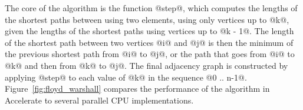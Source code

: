 %
%
%
%
%
%
%

%

The core of the algorithm is the function @step@, which computes the lengths of
the shortest paths between using two elements, using only vertices up to @k@,
given the lengths of the shortest paths using vertices up to @k - 1@. The length
of the shortest path between two vertices @i@ and @j@ is then the minimum of the
previous shortest path from @i@ to @j@, or the path that goes from @i@ to @k@
and then from @k@ to @j@. The final adjacency graph is constructed by applying
@step@ to each value of @k@ in the sequence @0 .. n-1@.
Figure~\ref{fig:floyd_warshall} compares the performance of the algorithm in
Accelerate to several parallel CPU implementations.


